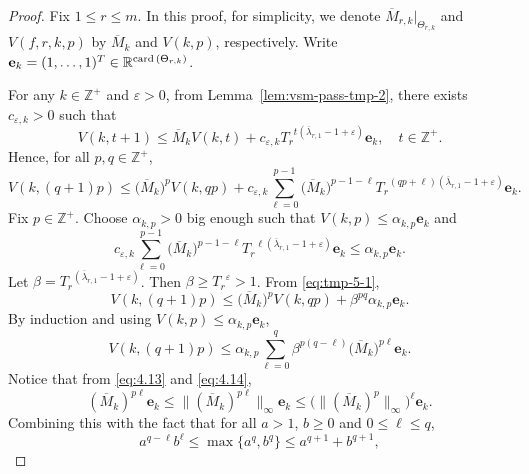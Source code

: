 \documentclass[11pt]{amsart}
\theoremstyle{definition}
\theoremstyle{remark}
\numberwithin{equation}{section}
\newcommand{\Z}{{\mathbb Z}}
\newcommand{\bfe}{{\mathbf e}}
\newcommand{\red}{\color{red}}
\newcommand{\upM}{{\overline{M}}}
\newcommand{\uplam}{{\overline{\lambda}}}
\def\vep{\varepsilon}
\newcommand{\card}{{\rm card\,}}
\begin{document}
\begin{proof}
	
	Fix $ 1 \leq r \leq m$.
	In this proof, for simplicity, we denote $\upM_{r,k}|_{\Theta_{r,k}}$ and $V(f,r,k,p)$ by $\upM_{k}$ and $V(k,p)$, respectively. 
	Write $\bfe_{k}  = (1,\ldots,1)^{T} \in \mathbb{R}^{\card (\Theta_{r,k})}$. 
	
	
	
	
	For any $k\in\Z^+$ and $\vep>0$, from Lemma~\ref{lem:vsm-pass-tmp-2}, there exists $c_{\vep,k}>0$ such that 
	\begin{equation*}%
		V(k,t+1) \leq \upM_{k} V(k,t)+c_{\vep,k} {T_r}^ {t (\uplam_{r,1}-1+\vep)} \bfe_{k}, \quad t \in \Z^+.
	\end{equation*}
	Hence, for all $p,q \in \Z^+$,
	\begin{equation}\label{eq:tmp-5-1}
		V(k,(q+1)p) 
		\leq \big(\upM_k\big)^p V(k,qp) +  c_{\vep,k}\sum_{\ell=0}^{p-1}  \big(\upM_k\big)^{p-1-\ell}   
		 {T_r}^ {(qp+\ell) (\uplam_{r,1}-1+\vep)} \bfe_{k}     .
	\end{equation}
	Fix $p \in \Z^+$.
	Choose $\alpha_{k,p}>0$ big enough such that
	$V(k,p) \leq \alpha_{k,p} \bfe_k$ and 
	\[
	  c_{\vep,k} \sum_{\ell=0}^{p-1}\big(\upM_k\big)^{p-1-\ell}    {T_r}^ {\ell (\uplam_{r,1}-1+\vep)} \bfe_{k} \leq \alpha_{k,p} \bfe_k.
	\]
	Let $\beta={T_r}^ {(\uplam_{r,1}-1+\vep)}$.
	Then $\beta \geq {T_r}^{\vep} >1$. From \eqref{eq:tmp-5-1},
	\begin{equation*}%
		V(k,(q+1)p) 
		\leq  \big(\upM_k\big)^p V(k,qp) + {\beta}^{pq} \alpha_{k,p} \bfe_{k}     .
	\end{equation*}
	By induction and using $V(k,p) \leq \alpha_{k,p} \bfe_k$,
	\[
	   V(k,(q+1)p) \leq  \alpha_{k,p} \sum_{\ell=0}^{q} {\beta}^{p(q-\ell)}  \big(\upM_k\big)^{p\ell}   \bfe_{k}.
	\]
	Notice that from \eqref{eq:4.13} and \eqref{eq:4.14}, 
	$$(\upM_k)^{p\ell} \bfe_k\leq \|(\upM_k)^{p\ell}\|_\infty \bfe_k\leq \big(\| (\upM_k)^p\|_\infty\big)^\ell \bfe_k.$$ 
	Combining this with the fact that for all $a>1$, $b\geq 0$ and $0\leq \ell\leq q$,
	\[
	a^{q-\ell}b^\ell \leq \max\{a^q,b^q\}\leq a^{q+1}+ b^{q+1},  
	\]

\end{proof}
\end{document}

